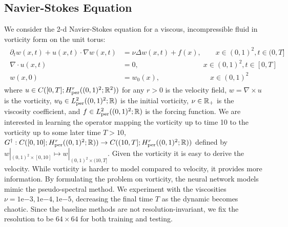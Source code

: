 \documentclass{article} %
\newcommand{\Ftrue}{G^\dagger}
\begin{document}
\subsection{ Navier-Stokes Equation}
\label{sec:ns}
We consider the 2-d Navier-Stokes equation for a viscous, incompressible fluid in vorticity form on the unit torus:
\begin{align}
\begin{split}
\partial_t w(x,t) + u(x,t) \cdot \nabla w(x,t) &= \nu \Delta w(x,t) + f(x), \qquad x \in (0,1)^2, t \in (0,T]  \\
\nabla \cdot u(x,t) &= 0, \qquad \qquad \qquad \qquad \quad x \in (0,1)^2, t \in [0,T]  \\
w(x,0) &= w_0(x), \qquad \qquad \qquad \quad x \in (0,1)^2 
\end{split}
\end{align}
where $u \in C([0,T]; H^r_{\text{per}}((0,1)^2; \mathbb{R}^2))$ for any $r>0$ is the velocity field, $w = \nabla \times u$ is the vorticity, $w_0 \in L^2_{\text{per}}((0,1)^2;\mathbb{R})$ is the initial vorticity,  $\nu \in \mathbb{R}_+$ is the viscosity coefficient, and $f \in L^2_{\text{per}}((0,1)^2;\mathbb{R})$ is the forcing function. We are interested in learning the operator mapping the vorticity up to time 10 to the vorticity up to some later time $T > 10$,
$\Ftrue: C([0,10]; H^r_{\text{per}}((0,1)^2; \R)) \to C((10,T]; H^r_{\text{per}}((0,1)^2; \R))$
defined by $w|_{(0,1)^2 \times [0,10]} \mapsto w|_{(0,1)^2 \times (10,T]}$. 
Given the vorticity it is easy to derive the velocity. While vorticity is harder to model compared to velocity, it provides more information. By formulating the problem on vorticity, the neural network models mimic the pseudo-spectral method. 
We experiment with the viscosities $\nu = 1\mathrm{e}{-3}, 1\mathrm{e}{-4}, 1\mathrm{e}{-5}$, decreasing the final time $T$ as the dynamic becomes chaotic.
Since the baseline methods are not resolution-invariant, we fix the resolution to be $64 \times 64$ for both training and testing.

\end{document}
